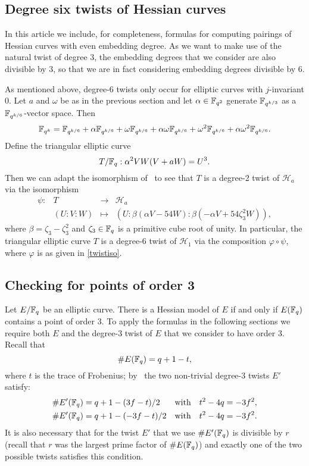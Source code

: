 \subsection{Degree six twists of Hessian curves}\label{sextic}

In this article we include, for completeness, formulas for computing pairings
of Hessian curves with even embedding degree. 
As we want to make use of the natural twist of degree 3, 
the embedding degrees that we consider are also divisible by 3, 
so that we are in fact considering embedding degrees divisible by 6.

As mentioned above, degree-6 twists only occur for elliptic curves
with $j$-invariant 0. 
Let $a$ and $\omega$ be as in the previous section
and let $\alpha \in \mathbb{F}_{q^2}$ generate $\mathbb{F}_{q^{k/3}}$ as a 
$\mathbb{F}_{q^{k/6}}$-vector space. Then
\[\mathbb{F}_{q^k} = \mathbb{F}_{q^{k/6}} + \alpha\mathbb{F}_{q^{k/6}} 
+\omega\mathbb{F}_{q^{k/6}} + \alpha\omega\mathbb{F}_{q^{k/6}}
+\omega^2\mathbb{F}_{q^{k/6}} + \alpha\omega^2\mathbb{F}_{q^{k/6}}.\] 
Define the triangular elliptic curve
\[T/\mathbb{F}_{q} : \alpha^2 VW(V + aW) = U^3.\]
Then we can adapt the isomorphism of~\cite[Theorem 5.3]{2015/hessian}
to see that $T$ is a degree-2 twist of $\mathcal{H}_a$ via
the isomorphism
\begin{equation}\label{quadtwist}
\begin{array}{rccc}
\psi: & T & \rightarrow & \mathcal{H}_a \\ 
& (U:V:W) & \mapsto &
(U:\beta(\alpha V - 54W) : \beta(-\alpha V + 54\zeta_3^2 W)),
\end{array}
\end{equation}
where $\beta = \zeta_3-\zeta_3^2$ and 
$\zeta_3 \in \mathbb{F}_{q}$ is a primitive cube root of unity.
In particular, the triangular elliptic curve $T$ is a degree-6 twist of $\mathcal{H}_1$ via the composition $\varphi \circ \psi$,
where $\varphi$ is as given in \eqref{twistiso}.

\subsection{Checking for points of order 3}\label{twist}

Let $E/\mathbb{F}_{q}$ be an elliptic curve. There is a Hessian model of $E$ if and only if $E(\mathbb{F}_{q})$ contains a point of order 3. 
To apply the formulas in the following sections we require both $E$ and the 
degree-3 twist of $E$ that we consider to have order 3.
Recall that
\[\#E(\mathbb{F}_{q}) = q+1-t,\]
where $t$ is the trace of Frobenius; 
by~\cite{2006/hess} the two non-trivial degree-3 twists $E'$ satisfy:
\begin{align*}
\# E' (\mathbb{F}_{q}) &= q + 1 - (3f - t) / 2 & \text{with} & \quad t^2 - 4q = -3f^2, \\
\# E' (\mathbb{F}_{q}) &= q + 1 - (-3f- t) / 2 & \text{with} & \quad t^2 - 4q = -3f^2.
\end{align*}
It is also necessary that for the twist $E'$ that we use $\#E'(\mathbb{F}_{q})$ is divisible by $r$ (recall that $r$ was the largest prime factor of $\# E(\mathbb{F}_{q})$) and exactly one of the two possible twists satisfies this condition.

